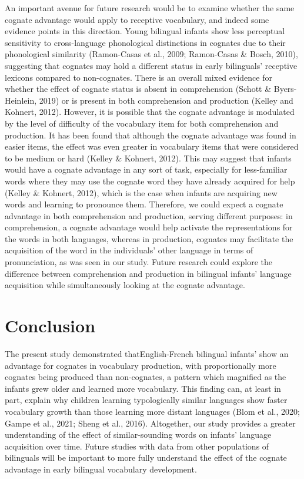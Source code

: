 \documentclass[
  english,
  ,man,floatsintext]{apa6}
\begin{document}
An important avenue for future research would be to examine whether the same cognate advantage would apply to receptive vocabulary, and indeed some evidence points in this direction. Young bilingual infants show less perceptual sensitivity to cross-language phonological distinctions in cognates due to their phonological similarity (Ramon-Casas et al., 2009; Ramon-Casas \& Bosch, 2010), suggesting that cognates may hold a different status in early bilinguals' receptive lexicons compared to non-cognates. There is an overall mixed evidence for whether the effect of cognate status is absent in comprehension (Schott \& Byers-Heinlein, 2019) or is present in both comprehension and production (Kelley and Kohnert, 2012). However, it is possible that the cognate advantage is modulated by the level of difficulty of the vocabulary item for both comprehension and production. It has been found that although the cognate advantage was found in easier items, the effect was even greater in vocabulary items that were considered to be medium or hard (Kelley \& Kohnert, 2012). This may suggest that infants would have a cognate advantage in any sort of task, especially for less-familiar words where they may use the cognate word they have already acquired for help (Kelley \& Kohnert, 2012), which is the case when infants are acquiring new words and learning to pronounce them. Therefore, we could expect a cognate advantage in both comprehension and production, serving different purposes: in comprehension, a cognate advantage would help activate the representations for the words in both languages, whereas in production, cognates may facilitate the acquisition of the word in the individuals' other language in terms of pronunciation, as was seen in our study. Future research could explore the difference between comprehension and production in bilingual infants' language acquisition while simultaneously looking at the cognate advantage.

\hypertarget{conclusion}{%
\section{Conclusion}\label{conclusion}}

The present study demonstrated thatEnglish-French bilingual infants' show an advantage for cognates in vocabulary production, with proportionally more cognates being produced than non-cognates, a pattern which magnified as the infants grew older and learned more vocabulary. This finding can, at least in part, explain why children learning typologically similar languages show faster vocabulary growth than those learning more distant languages (Blom et al., 2020; Gampe et al., 2021; Sheng et al., 2016). Altogether, our study provides a greater understanding of the effect of similar-sounding words on infants' language acquisition over time. Future studies with data from other populations of bilinguals will be important to more fully understand the effect of the cognate advantage in early bilingual vocabulary development.
\end{document}
